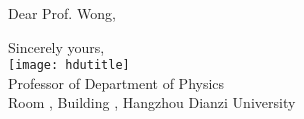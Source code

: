 \documentclass[mode = stationery]{hduthesis}
\begin{document}
\maketitle

Dear Prof. Wong,

\lipsum[1-2]

\vfill \raggedleft

Sincerely yours,\\[4ex]
\texttt{[image: hdutitle]}\\[2ex]
Professor of Department of Physics\\
Room , Building , Hangzhou Dianzi University

\vspace{\baselineskip}

\clearpage

\notelines[25]
\end{document}
